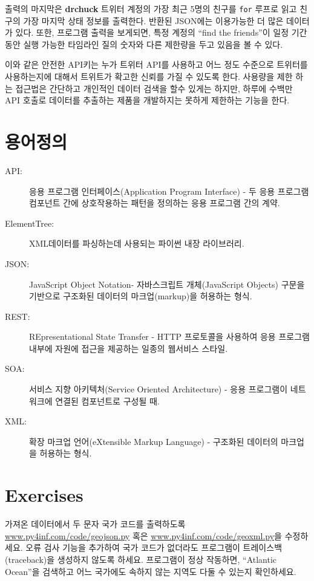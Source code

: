 출력의 마지막은 {\bf drchuck} 트위터 계정의 가장 최근 5명의 친구를 {\tt for} 루프로 읽고
친구의 가장 마지막 상태 정보를 출력한다. 반환된 JSON에는 이용가능한 더 많은 데이터가 있다.
또한, 프로그램 출력을 보게되면, 특정 계정의 ``find the friends''이 일정 기간동안 실행 가능한 타임라인 질의 숫자와
다른 제한량을 두고 있음을 볼 수 있다.

이와 같은 안전한 API키는 누가 트위터 API를 사용하고 어느 정도 수준으로 트위터를 사용하는지에 대해서 
트위트가 확고한 신뢰를 가질 수 있도록 한다. 사용량을 제한 하는 접근법은 간단하고 개인적인 데이터 검색을 
할수 있게는 하지만, 하루에 수백만 API 호출로 데이터를 추출하는 제품을 개발하지는 못하게 제한하는 기능을 한다.

\section{용어정의}

\begin{description}

\item[API:] 응용 프로그램 인터페이스(Application Program Interface) - 
두 응용 프로그램 컴포넌트 간에 상호작용하는 패턴을 정의하는 응용 프로그램 간의 계약.

\item[ElementTree:] XML데이터를 파싱하는데 사용되는 파이썬 내장 라이브러리.

\item[JSON:] JavaScript Object Notation- 자바스크립트 개체(JavaScript Objects) 구문을 기반으로
구조화된 데이터의 마크업(markup)을 허용하는 형식.

\item[REST:] REpresentational State Transfer -
HTTP 프로토콜을 사용하여 응용 프로그램 내부에 자원에 접근을 제공하는 일종의 웹서비스 스타일.

\item[SOA:] 서비스 지향 아키텍처(Service Oriented Architecture) - 
응용 프로그램이 네트워크에 연결된 컴포넌트로 구성될 때.

\item[XML:] 확장 마크업 언어(eXtensible Markup Language) - 
구조화된 데이터의 마크업을 허용하는 형식.

\end{description}

\section{Exercises}

\begin{ex}
가져온 데이터에서 두 문자 국가 코드를 출력하도록 \url{www.py4inf.com/code/geojson.py} 혹은
\url{www.py4inf.com/code/geoxml.py}을 수정하세요.
오류 검사 기능을 추가하여 국가 코드가 없더라도 프로그램이 트레이스백(traceback)을 생성하지 않도록 하세요.
프로그램이 정상 작동하면, ``Atlantic Ocean''을 검색하고 어느 국가에도 속하지 않는 지역도 다둘 수 있는지 확인하세요. 

\end{ex}

